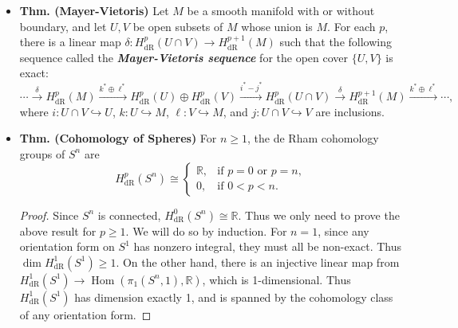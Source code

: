\documentclass{article}
\newcommand{\embedd}{\hookrightarrow}
\begin{document}
	\begin{itemize}
		\item \textbf{Thm. (Mayer-Vietoris)} Let $M$ be a smooth manifold with or without boundary, and let $U, V$ be open subsets of $M$ whose union is $M$. For each $p$, there is a linear map $\delta: H^{p}_{\text{dR}}(U \cap V) \to H^{p + 1}_{\text{dR}}(M)$ such that the following sequence called the \textbf{\textit{Mayer-Vietoris sequence}} for the open cover $\{U, V\}$ is exact: 
		\begin{equation*}
			\dotsm \xrightarrow{\delta} H^{p}_{\text{dR}}(M) \xrightarrow{k^{\ast} \oplus \ell^{\ast}} H^{p}_{\text{dR}}(U) \oplus H^{p}_{\text{dR}}(V) \xrightarrow{i^{\ast} - j^{\ast}} H^{p}_{\text{dR}}(U \cap V) \xrightarrow{\delta} H^{p + 1}_{\text{dR}}(M) \xrightarrow{k^{\ast} \oplus \ell^{\ast}} \dotsm, 
		\end{equation*}
		where $i: U \cap V \embedd U$, $k: U \embedd M$, $\ell: V\embedd M$, and $j: U \cap V \embedd V$ are inclusions. 
		
		\item \textbf{Thm. (Cohomology of Spheres)} For $n\geq 1$, the de Rham cohomology groups of $S^{n}$ are 
		\begin{equation*}
			H^{p}_{\text{dR}}(S^{n}) \cong 
			\begin{cases}
				\mathbb{R}, & \text{if $p = 0$ or $p =n$}, \\
				0, & \text{if $0 < p < n$}. 
			\end{cases}
		\end{equation*}
		\vspace{-0.25cm}
		\begin{proof}
			Since $S^{n}$ is connected, $H^{0}_{\text{dR}}(S^{n}) \cong \mathbb{R}$. Thus we only need to prove the above result for $p \geq 1$. We will do so by induction. For $n = 1$, since any orientation form on $S^{1}$ has nonzero integral, they must all be non-exact. Thus $\dim{H^{1}_{\text{dR}}(S^{1})} \geq 1$. On the other hand, there is an injective linear map from $H^{1}_{\text{dR}}(S^{1}) \to \operatorname{Hom}(\pi_{1}(S^{n},1), \mathbb{R})$, which is 1-dimensional. Thus $H^{1}_{\text{dR}}(S^{1})$ has dimension exactly 1, and is spanned by the cohomology class of any orientation form. 
			

\end{proof}
\end{itemize}
\end{document}
